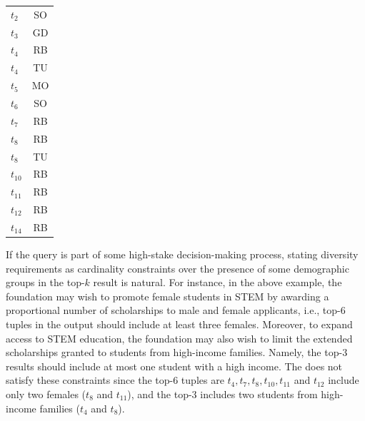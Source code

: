\begin{table}[ht]
\begin{minipage}{.35\linewidth}
\begin{tabular}{lc}
        $t_{2}$            & SO        \\  
        $t_{3}$            & GD        \\  
        $t_{4}$            & RB        \\
        $t_{4}$            & TU        \\
        $t_{5}$            & MO        \\  
        $t_{6}$            & SO        \\  
        $t_{7}$            & RB        \\  
        $t_{8}$          & RB        \\
        $t_{8}$           & TU        \\
        $t_{10}$           & RB        \\  
        $t_{11}$           & RB        \\  
        $t_{12}$           & RB        \\
        $t_{14}$          & RB        \\
    \end{tabular}
\end{minipage}
\end{table}




If the query is part of some high-stake decision-making process, stating diversity requirements as cardinality constraints over the presence of some demographic groups in the top-$k$ result is natural. For instance, in the above example, the foundation may wish to promote female students in STEM by awarding a proportional number of scholarships to male and female applicants, i.e.,  top-$6$ tuples in the output should include at least three females. Moreover, to expand access to STEM education, the foundation may also wish to limit the extended scholarships granted to students from high-income families. Namely, the top-$3$ results should include at most one student with a high income. The \running{} does not satisfy these constraints since the top-$6$ tuples are $t_4, t_7, t_8, t_{10}, t_{11}$ and $t_{12}$ include only two females ($t_8$ and $t_{11}$), and the top-$3$ includes two students from high-income families ($t_4$ and $t_{8}$). 


